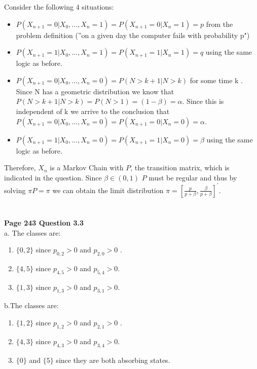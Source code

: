 \documentclass[10pt,a4paper]{article}
\begin{document}
\begin{flushleft}
Consider the following 4 situations:
\begin{itemize}
    \item $P(X_{n+1}=0|X_0,\ldots,X_n=1)=P(X_{n+1}=0|X_n=1)=p$ from the
problem definition (''on a given day the computer fails with
probability p")
    \item $P(X_{n+1}=1|X_0,\ldots,X_n=1)=P(X_{n+1}=1|X_n=1)=q$
    using the same logic as before.
    \item $P(X_{n+1}=0|X_0,\ldots,X_n=0)=P(N>k+1|N>k)$ for some time k . Since N
    has a geometric distribution we know that
    $P(N>k+1|N>k)=P(N>1)=(1-\beta)=\alpha$. Since this is
    independent of k we arrive to the conclusion that
    $P(X_{n+1}=0|X_0,\ldots,X_n=0)=P(X_{n+1}=0|X_n=0)=\alpha$.
    \item
    $P(X_{n+1}=1|X_0,\ldots,X_n=0)=P(X_{n+1}=1|X_n=0)=\beta$ using the
    same logic as before.
\end{itemize}

Therefore, $X_n$ is a Markov Chain with $P$, the transition
matrix, which is indicated in the question. Since $\beta\in(0,1)$
$P$ must be regular and thus by solving $\pi P= \pi$ we can obtain
the limit distribution
$\pi=[\frac{p}{p+\beta},\frac{\beta}{p+\beta}]^{'}$.

\begin{eqnarray*}
\\
\end{eqnarray*}

\textbf{Page 243 Question 3.3}\\

a. The classes are:
\begin{enumerate}
    \item $\{0,2\}$ since $p_{0,2}>0$ and $p_{2,0}>0$ .
    \item $\{4,5\}$ since $p_{4,5}>0$ and $p_{5,4}>0$.
    \item $\{1,3\}$ since $p_{1,3}>0$ and $p_{3,1}>0$.
\end{enumerate}

b.The classes are:
\begin{enumerate}
    \item $\{1,2\}$ since $p_{1,2}>0$ and $p_{2,1}>0$ .
    \item $\{4,3\}$ since $p_{4,3}>0$ and $p_{3,4}>0$.
    \item $\{0\}$ and $\{5\}$ since they are both absorbing states.
\end{enumerate}


\begin{eqnarray*}
\\
\end{eqnarray*}



\end{flushleft}
\end{document}
